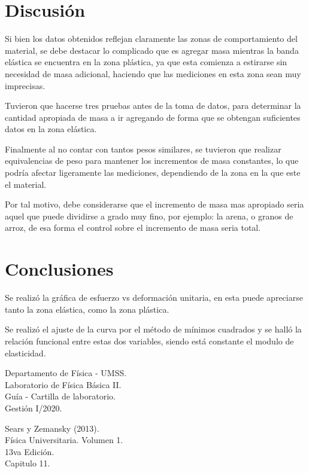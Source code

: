 \documentclass[letter,11pt]{article}
\begin{document}
\section{Discusión}

Si bien los datos obtenidos reflejan claramente las zonas de comportamiento del
material, se debe destacar lo complicado que es agregar masa mientras la banda
elástica se encuentra en la zona plástica, ya que esta comienza a estirarse sin
necesidad de masa adicional, haciendo que las mediciones en esta zona sean muy
imprecisas.

Tuvieron que hacerse tres pruebas antes de la toma de datos, para determinar la
cantidad apropiada de masa a ir agregando de forma que se obtengan suficientes
datos en la zona elástica.

Finalmente al no contar con tantos pesos similares, se tuvieron que realizar
equivalencias de peso para mantener los incrementos de masa constantes, lo que
podría afectar ligeramente las mediciones, dependiendo de la zona en la que este
el material.

Por tal motivo, debe considerarse que el incremento de masa mas apropiado seria
aquel que puede dividirse a grado muy fino, por ejemplo: la arena, o granos de
arroz, de esa forma el control sobre el incremento de masa seria total.

\section{Conclusiones}

Se realizó la gráfica de esfuerzo vs deformación unitaria, en esta puede
apreciarse tanto la zona elástica, como la zona plástica.

Se realizó el ajuste de la curva por el método de mínimos cuadrados y se halló
la relación funcional entre estas dos variables, siendo está constante el
modulo de elasticidad.

\begin{thebibliography}{99}

 Departamento de Física - UMSS.\\
Laboratorio de Física Básica II.\\
Guía - Cartilla de laboratorio.\\
Gestión I/2020.

 Sears y Zemansky (2013).\\
Física Universitaria. Volumen 1.\\
13va Edición.\\
Capitulo 11.

\end{thebibliography}
\end{document}
